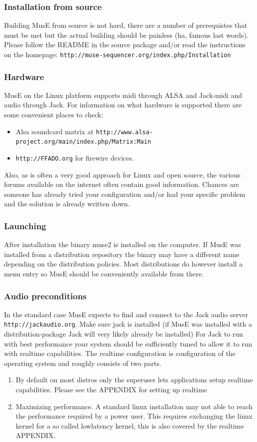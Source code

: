 \documentclass[a4paper]{report}
\newcommand{\url}[1]{\texttt{#1}}
\begin{document}
\subsubsection{Installation from source}
Building MusE from source is not hard, there are a number of prerequistes
that must be met but the actual building should be painless (ha, famous
last words).\\
Please follow the README in the source package and/or read the instructions
on the homepage: \url{http://muse-sequencer.org/index.php/Installation}

\subsubsection{Hardware}
MusE on the Linux platform supports midi through ALSA and Jack-midi and audio
through Jack. For information on what hardware is supported there are some
convenient places to check:
\begin{itemize}
\item Alsa soundcard matrix at 
\url{http://www.alsa-project.org/main/index.php/Matrix:Main} 
\item \url{http://FFADO.org} for firewire devices. 
\end{itemize}
Also, as is often a very good approach for Linux and open source, the
various forums available on the internet often contain good information.
Chances are someone has already tried your configuration and/or had your
specific problem and the solution is already written down.
\subsubsection{Launching}
After installation the binary muse2 is installed on the computer. If MusE
was installed from a distribution repository the binary may have a
different name depending on the distribution policies. Most distributions
do however install a menu entry so MusE should be conveniently available
from there.
\subsubsection{Audio preconditions}
In the standard case MusE expects to find and connect to the Jack audio
server \url{http://jackaudio.org}. Make sure jack is installed (if MusE was
installed with a distribution-package Jack will very likely already be
installed) For Jack to run with best performance your system should be
sufficiently tuned to allow it to run with realtime capabilities. The
realtime configuration is configuration of the operating system and roughly
consists of two parts.
\begin{enumerate}
\item By default on most distros only the superuser lets applications setup
realtime capabilities. Please see the APPENDIX for setting up realtime 
\item Maximizing performance. A standard linux installation may not able
to reach the performance required by a power user. This requires exchanging
the linux kernel for a so called lowlatency kernel, this is also covered by
the realtime APPENDIX.
\end{enumerate}
\end{document}
